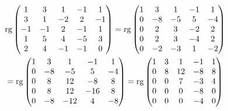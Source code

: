 \documentclass[12pt, a4paper]{article}
\begin{document}
    \begin{multline}
        \operatorname{rg} \begin{pmatrix}
                1 & 3 & 1 & -1 & 1 \\
                3 & 1 & -2 & 2 & -1 \\
                -1 & -1 & 2 & -1 & 1 \\
                1 & 5 & 4 & -5 & 3 \\
                2 & 4 & -1 & -1 & 0
        \end{pmatrix} = \operatorname{rg} \left(\begin{matrix}
            1 & 3 & 1 & -1 & 1 \\
            0 & -8 & -5 & 5 & -4 \\
            0 & 2 & 3 & -2 & 2 \\
            0 & 2 & 3 & -4 & 2 \\
            0 & -2 & -3 & 1 & -2
        \end{matrix}\right) \\ = \operatorname{rg} \left(\begin{matrix}
            1 & 3 & 1 & -1 & 1 \\
            0 & -8 & -5 & 5 & -4 \\
            0 & 8 & 12 & -8 & 8 \\
            0 & 8 & 12 & -16 & 8 \\
            0 & -8 & -12 & 4 & -8
        \end{matrix}\right) = \operatorname{rg} \left(\begin{matrix}
            1 & 3 & 1 & -1 & 1 \\
            0 & 8 & 12 & -8 & 8 \\
            0 & 0 & 7 & -3 & 4 \\
            0 & 0 & 0 & -8 & 0 \\
            0 & 0 & 0 & -4 & 0
        \end{matrix}\right)
    \end{multline}
\end{document}
